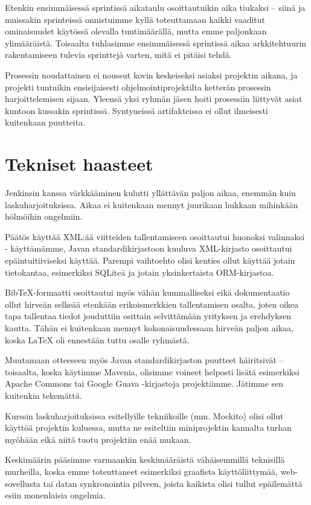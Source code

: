 \documentclass{article}
\begin{document}
Etenkin ensimmäisessä sprintissä aikataulu osoittautuikin aika tiukaksi -- siinä ja muissakin sprinteissä onnistuimme kyllä toteuttamaan kaikki vaaditut ominaisuudet käytössä olevalla tuntimäärällä, mutta emme paljonkaan ylimääräistä. Toisaalta tuhlasimme ensimmäisessä sprintissä aikaa arkkitehtuurin rakentamiseen tulevia sprinttejä varten, mitä ei pitäisi tehdä.

Prosessin noudattainen ei noussut kovin keskeiseksi asiaksi projektin aikana, ja projekti tuntuikin ensisijaisesti ohjelmointiprojektilta ketterän prosessin harjoittelemisen sijaan. Yleensä yksi ryhmän jäsen hoiti prosessiin liittyvät asiat kuntoon kussakin sprintissä. Syntyneissä artifakteissa ei ollut ilmeisesti kuitenkaan puutteita.



\section{Tekniset haasteet}

Jenkinsin kanssa värkkääminen kulutti yllättävän paljon aikaa, enemmän kuin laskuharjoituksissa. Aikaa ei kuitenkaan mennyt juurikaan hukkaan mihinkään hölmöihin ongelmiin.

Päätös käyttää XML:ää viitteiden tallentamiseen osoittautui huonoksi valinnaksi - käyttämämme, Javan standardikirjastoon kuuluva XML-kirjasto osoittautui epäintuitiiviseksi käyttää. Parempi vaihtoehto olisi kenties ollut käyttää jotain tietokantaa, esimerkiksi SQLiteä ja jotain yksinkertaista ORM-kirjastoa.

BibTeX-formaatti osoittautui myös vähän kummalliseksi eikä dokumentaatio ollut hirveän selkeää etenkään erikoismerkkien tallentamisen osalta, joten oikea tapa tallentaa tiedot jouduttiin osittain selvittämään yrityksen ja erehdyksen kautta. Tähän ei kuitenkaan mennyt kokonaisuudessaan hirveän paljon aikaa, koska LaTeX oli ennestään tuttu osalle ryhmästä.

Muutamaan otteeseen myös Javan standardikirjaston puutteet häiritsivät -- toisaalta, koska käytimme Mavenia, olisimme voineet helposti lisätä esimerkiksi Apache Commons tai Google Guava -kirjastoja projektiimme. Jätimme sen kuitenkin tekemättä.

Kurssin laskuharjoituksissa esitellyille tekniikoille (mm. Mockito) olisi ollut käyttöä projektin kuluessa, mutta ne esiteltiin miniprojektin kannalta turhan myöhään eikä niitä tuotu projektiin enää mukaan.

Keskimäärin pääsimme varmaankin keskimääräistä vähäisemmillä teknisillä murheilla, koska emme toteuttaneet esimerkiksi graafista käyttöliittymää, web-sovellusta tai datan synkronointia pilveen, joista kaikista olisi tullut epäilemättä esiin monenlaisia ongelmia.
\end{document}
